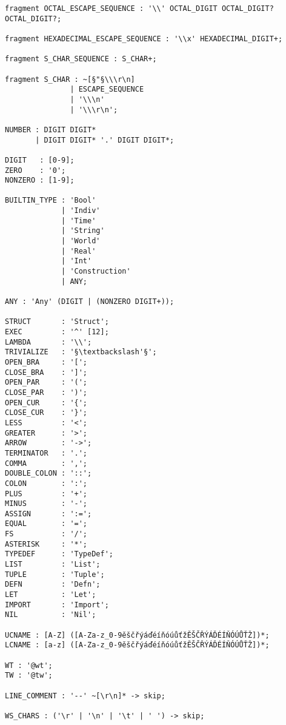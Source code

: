 \begin{lstlisting}[caption=Gramatika jazyka TIL-Script,language=Antlr,escapeinside={{§}{§}}]
fragment OCTAL_ESCAPE_SEQUENCE : '\\' OCTAL_DIGIT OCTAL_DIGIT? OCTAL_DIGIT?;

fragment HEXADECIMAL_ESCAPE_SEQUENCE : '\\x' HEXADECIMAL_DIGIT+;

fragment S_CHAR_SEQUENCE : S_CHAR+;

fragment S_CHAR : ~[§"§\\\r\n]
               | ESCAPE_SEQUENCE
               | '\\\n'
               | '\\\r\n';

NUMBER : DIGIT DIGIT*
       | DIGIT DIGIT* '.' DIGIT DIGIT*;

DIGIT   : [0-9];
ZERO    : '0';
NONZERO : [1-9];

BUILTIN_TYPE : 'Bool'
             | 'Indiv'
             | 'Time'
             | 'String'
             | 'World'
             | 'Real'
             | 'Int'
             | 'Construction'
             | ANY;

ANY : 'Any' (DIGIT | (NONZERO DIGIT+));

STRUCT       : 'Struct';
EXEC         : '^' [12];
LAMBDA       : '\\';
TRIVIALIZE   : '§\textbackslash'§';
OPEN_BRA     : '[';
CLOSE_BRA    : ']';
OPEN_PAR     : '(';
CLOSE_PAR    : ')';
OPEN_CUR     : '{';
CLOSE_CUR    : '}';
LESS         : '<';
GREATER      : '>';
ARROW        : '->';
TERMINATOR   : '.';
COMMA        : ',';
DOUBLE_COLON : '::';
COLON        : ':';
PLUS         : '+';
MINUS        : '-';
ASSIGN       : ':=';
EQUAL        : '=';
FS           : '/';
ASTERISK     : '*';
TYPEDEF      : 'TypeDef';
LIST         : 'List';
TUPLE        : 'Tuple';
DEFN         : 'Defn';
LET          : 'Let';
IMPORT       : 'Import';
NIL          : 'Nil';

UCNAME : [A-Z] ([A-Za-z_0-9ěščřýáďéíňóúůťžĚŠČŘÝÁĎÉÍŇÓÚŮŤŽ])*;
LCNAME : [a-z] ([A-Za-z_0-9ěščřýáďéíňóúůťžĚŠČŘÝÁĎÉÍŇÓÚŮŤŽ])*;

WT : '@wt';
TW : '@tw';

LINE_COMMENT : '--' ~[\r\n]* -> skip;

WS_CHARS : ('\r' | '\n' | '\t' | ' ') -> skip;
\end{lstlisting}

\clearpage

\endinput
